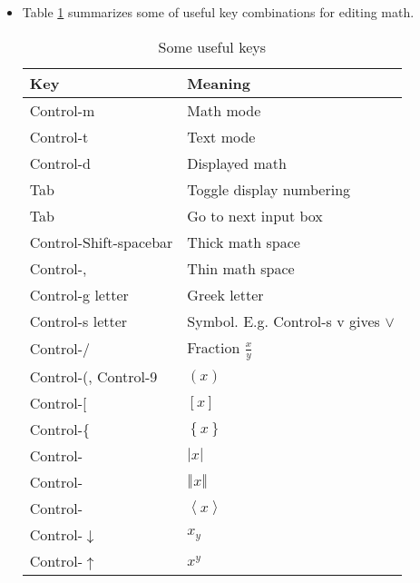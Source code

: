 \begin{itemize}
\item Table \ref{tab:keys} summarizes some of useful key combinations for
editing math. 
\begin{table}[tbp] \centering%
\begin{singlespaced}%
\begin{tabular}{|l|l|}
\hline\hline
\multicolumn{1}{||l|}{\textbf{Key}} & \multicolumn{1}{|l||}{\textbf{Meaning}}
\\ \hline\hline
Control-m & Math mode \\ \hline
Control-t & Text mode \\ \hline
Control-d & Displayed math \\ \hline
Tab & Toggle display numbering \\ \hline
Tab & Go to next input box \\ \hline
Control-Shift-spacebar & Thick math space \\ \hline
Control-, & Thin math space \\ \hline
Control-g letter & Greek letter \\ \hline
Control-s letter & Symbol. E.g. Control-s v gives $\vee $ \\ \hline
Control-/ & Fraction $\frac{x}{y}$ \\ \hline
Control-(, Control-9 & $\left( x\right) $ \\ \hline
Control-[ & $\left[ x\right] $ \\ \hline
Control-\{ & $\left\{ x\right\} $ \\ \hline
Control-\TEXTsymbol{\backslash} & $\left\vert x\right\vert $ \\ \hline
Control-\TEXTsymbol{\vert} & $\left\Vert x\right\Vert $ \\ \hline
Control-\TEXTsymbol{<} & $\left\langle x\right\rangle $ \\ \hline
Control-$\downarrow $ & $x_{y}$ \\ \hline
Control-$\uparrow $ & $x^{y}$ \\ \hline
\end{tabular}%
\end{singlespaced}%
\caption{Some useful keys}\label{tab:keys}%
\end{table}%
\end{itemize}

